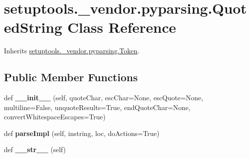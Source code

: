 \hypertarget{classsetuptools_1_1__vendor_1_1pyparsing_1_1_quoted_string}{}\section{setuptools.\+\_\+vendor.\+pyparsing.\+Quoted\+String Class Reference}
\label{classsetuptools_1_1__vendor_1_1pyparsing_1_1_quoted_string}


Inherits \hyperlink{classsetuptools_1_1__vendor_1_1pyparsing_1_1_token}{setuptools.\+\_\+vendor.\+pyparsing.\+Token}.

\subsection*{Public Member Functions}
\begin{DoxyCompactItemize}
\item 
\mbox{\label{classsetuptools_1_1__vendor_1_1pyparsing_1_1_quoted_string_a1a3a547693c021372bbfa78f54ddc21c}} 
def {\bfseries \+\_\+\+\_\+init\+\_\+\+\_\+} (self, quote\+Char, esc\+Char=None, esc\+Quote=None, multiline=False, unquote\+Results=True, end\+Quote\+Char=None, convert\+Whitespace\+Escapes=True)
\item 
\mbox{\label{classsetuptools_1_1__vendor_1_1pyparsing_1_1_quoted_string_a10118fc33f414ae1a70906ee21a119b7}} 
def {\bfseries parse\+Impl} (self, instring, loc, do\+Actions=True)
\item 
\mbox{\label{classsetuptools_1_1__vendor_1_1pyparsing_1_1_quoted_string_a4846420aa145033b662efb8ee19d075e}} 
def {\bfseries \+\_\+\+\_\+str\+\_\+\+\_\+} (self)
\end{DoxyCompactItemize}
